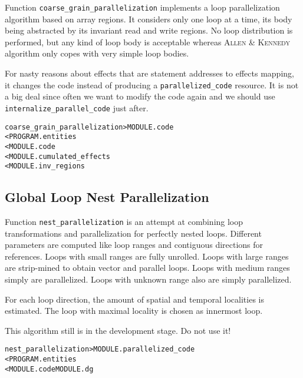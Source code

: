 \documentclass[a4paper]{report}
\newenvironment{PipsMake}{\begin{alltt}}{\end{alltt}}
\begin{document}
Function \verb+coarse_grain_parallelization+ implements a loop parallelization
algorithm based on array regions. It considers only one loop at a time, its
body being abstracted by its invariant read and write regions. No loop
distribution is performed, but any kind of loop body is acceptable
whereas \textsc{Allen} \& \textsc{Kennedy} algorithm only copes with very simple loop bodies.

For nasty reasons about effects that are statement addresses to effects
mapping, it changes the code instead of producing a
\verb|parallelized_code| resource. It is not a big deal since often we
want to modify the code again and we should use
\verb|internalize_parallel_code| just after.
\begin{PipsMake}
coarse_grain_parallelization > MODULE.code
        < PROGRAM.entities
        < MODULE.code
        < MODULE.cumulated_effects
        < MODULE.inv_regions
\end{PipsMake}


\subsection{Global Loop Nest Parallelization}

Function \verb+nest_parallelization+ is an attempt at combining loop
transformations and parallelization for perfectly nested
loops. Different parameters are computed like loop ranges and contiguous
directions for references. Loops with small ranges are fully
unrolled. Loops with large ranges are strip-mined to obtain vector and
parallel loops. Loops with medium ranges simply are parallelized. Loops
with unknown range also are simply parallelized.

For each loop direction, the amount of spatial and temporal localities
is estimated. The loop with maximal locality is chosen as innermost
loop.

This algorithm still is in the development stage. Do not use
it!


\begin{PipsMake}
nest_parallelization                    > MODULE.parallelized_code
        < PROGRAM.entities
        < MODULE.code MODULE.dg
\end{PipsMake}
\end{document}
